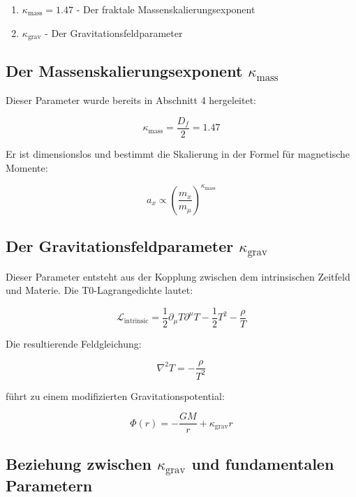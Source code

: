 	\begin{enumerate}
		\item $\kappa_{\text{mass}} = 1.47$ - Der fraktale Massenskalierungsexponent
		\item $\kappa_{\text{grav}}$ - Der Gravitationsfeldparameter
	\end{enumerate}
	
	\subsection{Der Massenskalierungsexponent $\kappa_{\text{mass}}$}
	
	Dieser Parameter wurde bereits in Abschnitt 4 hergeleitet:
	
	\begin{equation}
		\kappa_{\text{mass}} = \frac{D_f}{2} = 1.47
	\end{equation}
	
	Er ist dimensionslos und bestimmt die Skalierung in der Formel für magnetische Momente:
	
	\begin{equation}
		a_x \propto \left(\frac{m_x}{m_\mu}\right)^{\kappa_{\text{mass}}}
	\end{equation}
	
	\subsection{Der Gravitationsfeldparameter $\kappa_{\text{grav}}$}
	
	Dieser Parameter entsteht aus der Kopplung zwischen dem intrinsischen Zeitfeld und Materie. Die T0-Lagrangedichte lautet:
	
	\begin{equation}
		\mathcal{L}_{\text{intrinsic}} = \frac{1}{2}\partial_\mu T \partial^\mu T - \frac{1}{2}T^2 - \frac{\rho}{T}
	\end{equation}
	
	Die resultierende Feldgleichung:
	
	\begin{equation}
		\nabla^2 T = -\frac{\rho}{T^2}
	\end{equation}
	
	führt zu einem modifizierten Gravitationspotential:
	
	\begin{equation}
		\Phi(r) = -\frac{GM}{r} + \kappa_{\text{grav}} r
	\end{equation}
	
	\subsection{Beziehung zwischen $\kappa_{\text{grav}}$ und fundamentalen Parametern}
	
